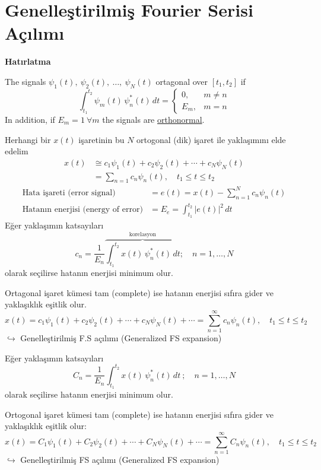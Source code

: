 \documentclass[11pt,a4paper]{article}
\begin{document}

\section{Genelleştirilmiş Fourier Serisi Açılımı}
\textbf{Hatırlatma}

The signals $\psi_1(t),\ \psi_2(t),\ \ldots,\ \psi_N(t)$ ortagonal over $[t_1,t_2]$ if
\[ \int_{t_1}^{t_2}\psi_m(t)\,\psi_n^{*}(t)\,dt=\begin{cases} 0, & m\neq n \\ E_m, & m=n\end{cases} \]
In addition, if $E_m=1\ \forall m$ the signals are \underline{orthonormal}.

\medskip
Herhangi bir $x(t)$ işaretinin bu $N$ ortogonal (dik) işaret ile yaklaşımını elde edelim
\begin{align*}
x(t) &\cong c_1\psi_1(t)+c_2\psi_2(t)+\cdots+c_N\psi_N(t) \\
&= \sum_{n=1}c_n\psi_n(t),\quad t_1\le t\le t_2
\end{align*}
\begin{align*}
\text{Hata işareti (error signal)} &= e(t) = x(t)-\sum_{n=1}^{N}c_n\psi_n(t) \\
\text{Hatanın enerjisi (energy of error)} &= E_e = \int_{t_1}^{t_2}|e(t)|^2\,dt
\end{align*}
Eğer yaklaşımın katsayıları
\[ c_n=\frac{1}{E_n}\overbrace{\int_{t_1}^{t_2}x(t)\,\psi_n^{*}(t)\,dt}^{\text{korelasyon}};\quad n=1,\ldots,N \]
olarak seçilirse hatanın enerjisi minimum olur.

Ortagonal işaret kümesi tam (complete) ise hatanın enerjisi sıfıra gider ve yaklaşıklık eşitlik olur.
\[ x(t)=c_1\psi_1(t)+c_2\psi_2(t)+\cdots+c_N\psi_N(t)+\cdots=\sum_{n=1}^{\infty}c_n\psi_n(t),\quad t_1\le t\le t_2 \]
$\hookrightarrow$ Genelleştirilmiş F.S açılımı (Generalized FS expansion)

Eğer yaklaşımın katsayıları
\[ C_n=\frac{1}{E_n}\int_{t_1}^{t_2}x(t)\,\psi_n^{*}(t)\,dt\ ;\quad n=1,\ldots,N \]
olarak seçilirse hatanın enerjisi minimum olur.

Ortogonal işaret kümesi tam (complete) ise hatanın enerjisi sıfıra gider ve yaklaşıklık eşitlik olur:
\[ x(t)=C_1\psi_1(t)+C_2\psi_2(t)+\cdots+C_N\psi_N(t)+\cdots=\sum_{n=1}^{\infty}C_n\psi_n(t),\quad t_1\le t\le t_2 \]
$\hookrightarrow$ Genelleştirilmiş FS açılımı (Generalized FS expansion)
\end{document}
